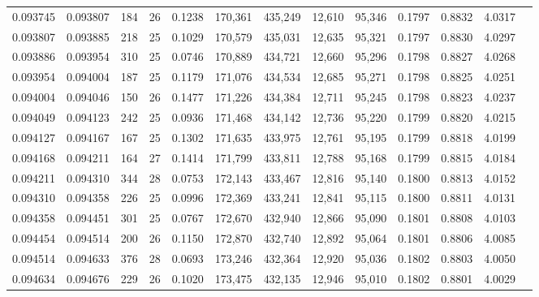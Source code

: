 \begin{tabular}{rrrrrrrrrrrrr}
0.093745 & 0.093807 & 184 &  26 &                                     0.1238 & 170,361 & 435,249 &  12,610 &  95,346 & 0.1797 & 0.8832 & 4.0317 \\
0.093807 & 0.093885 & 218 &  25 &                                     0.1029 & 170,579 & 435,031 &  12,635 &  95,321 & 0.1797 & 0.8830 & 4.0297 \\
0.093886 & 0.093954 & 310 &  25 &                                     0.0746 & 170,889 & 434,721 &  12,660 &  95,296 & 0.1798 & 0.8827 & 4.0268 \\
0.093954 & 0.094004 & 187 &  25 &                                     0.1179 & 171,076 & 434,534 &  12,685 &  95,271 & 0.1798 & 0.8825 & 4.0251 \\
0.094004 & 0.094046 & 150 &  26 &                                     0.1477 & 171,226 & 434,384 &  12,711 &  95,245 & 0.1798 & 0.8823 & 4.0237 \\
0.094049 & 0.094123 & 242 &  25 &                                     0.0936 & 171,468 & 434,142 &  12,736 &  95,220 & 0.1799 & 0.8820 & 4.0215 \\
0.094127 & 0.094167 & 167 &  25 &                                     0.1302 & 171,635 & 433,975 &  12,761 &  95,195 & 0.1799 & 0.8818 & 4.0199 \\
0.094168 & 0.094211 & 164 &  27 &                                     0.1414 & 171,799 & 433,811 &  12,788 &  95,168 & 0.1799 & 0.8815 & 4.0184 \\
0.094211 & 0.094310 & 344 &  28 &                                     0.0753 & 172,143 & 433,467 &  12,816 &  95,140 & 0.1800 & 0.8813 & 4.0152 \\
0.094310 & 0.094358 & 226 &  25 &                                     0.0996 & 172,369 & 433,241 &  12,841 &  95,115 & 0.1800 & 0.8811 & 4.0131 \\
0.094358 & 0.094451 & 301 &  25 &                                     0.0767 & 172,670 & 432,940 &  12,866 &  95,090 & 0.1801 & 0.8808 & 4.0103 \\
0.094454 & 0.094514 & 200 &  26 &                                     0.1150 & 172,870 & 432,740 &  12,892 &  95,064 & 0.1801 & 0.8806 & 4.0085 \\
0.094514 & 0.094633 & 376 &  28 &                                     0.0693 & 173,246 & 432,364 &  12,920 &  95,036 & 0.1802 & 0.8803 & 4.0050 \\
0.094634 & 0.094676 & 229 &  26 &                                     0.1020 & 173,475 & 432,135 &  12,946 &  95,010 & 0.1802 & 0.8801 & 4.0029 \\

\end{tabular}
